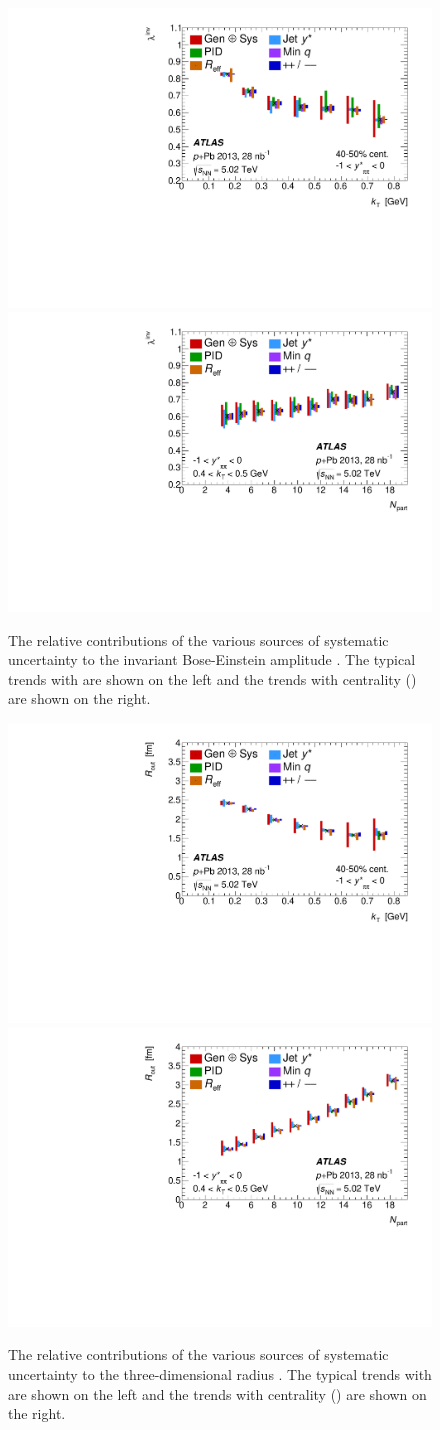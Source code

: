 \begin{figure}[t]
\centering
\includegraphics[width=0.49\linewidth]{canqinv_x_vs_kt_systs.pdf}
\includegraphics[width=0.49\linewidth]{canqinv_x_vs_npart_systs.pdf}\\
\caption{The relative contributions of the various sources of systematic uncertainty to the invariant Bose-Einstein amplitude \linv. The typical trends with \kt are shown on the left and the trends with centrality (\Npart) are shown on the right.}
\label{fig:syst_linv}
\end{figure}

\begin{figure}[t]
\centering
\includegraphics[width=0.49\linewidth]{canqosl_Rout_vs_kt_systs.pdf}
\includegraphics[width=0.49\linewidth]{canqosl_Rout_vs_npart_systs.pdf}\\
\caption{The relative contributions of the various sources of systematic uncertainty to the three-dimensional radius \Rout. The typical trends with \kt are shown on the left and the trends with centrality (\Npart) are shown on the right.}
\label{fig:syst_rout}
\end{figure}

